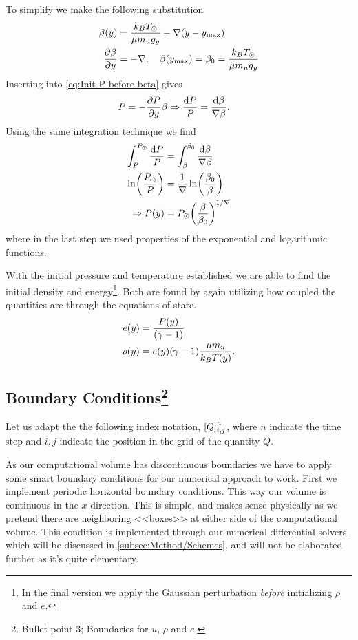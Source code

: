 \documentclass[11pt,a4paper,twocolumn,titlepage]{article}
\newcommand{\disc}[1]    %
{
\ensuremath
\qty[#1]_{i,j}^{n}
}
\begin{document}
To simplify we make the following substitution
\begin{align*}
\beta(y) &= \frac{k_BT_\odot}{\mu m_u g_y}-\nabla(y-y_\text{max})
\\
\pdv{\beta}{y} &= -\nabla \qc \beta(y_\text{max}) = \beta_0 = \frac{k_BT_\odot}{\mu m_u g_y}
\end{align*}
Inserting into \cref{eq:Init P before beta} gives
\begin{align*}
P &= -\pdv{P}{y}\beta \Rightarrow \frac{\dd{P}}{P} = \frac{\dd{\beta}}{\nabla \beta}.
\end{align*}
Using the same integration technique we find
\begin{align}
\int_P^{P_\odot} \frac{\dd{P}}{P} &= \int_\beta^{\beta_0}\frac{\dd{\beta}}{\nabla\beta} \notag
\\
\ln(\frac{P_\odot}{P}) &= \frac{1}{\nabla}\ln(\frac{\beta_0}{\beta}) \notag
\\
\Rightarrow P(y) &= P_\odot \qty(\frac{\beta}{\beta_0})^{1/\nabla} \label{eq:Initial P}
\end{align}
where in the last step we used properties of the exponential and logarithmic functions.

With the initial pressure and temperature established we are able to find the initial density and energy\footnote{In the final version we apply the Gaussian perturbation \textit{before} initializing $\rho$ and $e$.}. Both are found by again utilizing how coupled the quantities are through the equations of state. 
\begin{align}
e(y) &= \frac{P(y)}{(\gamma-1)} \label{eq:Initial e}
\\
\rho(y) &= e(y)\qty(\gamma-1)\frac{\mu m_u}{k_BT(y)}. \label{eq:Initial rho}
\end{align}

\subsection[Boundary Conditions]{Boundary Conditions\protect\footnote{Bullet point 3; Boundaries for $u$, $\rho$ and $e$.}}\label{subsec:Governing/Boundary}
Let us adapt the the following index notation, $\disc{Q}$, where $n$ indicate the time step and $i,j$ indicate the position in the grid of the quantity $Q$.

As our computational volume has discontinuous boundaries we have to apply some smart boundary conditions for our numerical approach to work. First we implement periodic horizontal boundary conditions. This way our volume is continuous in the $x$-direction. This is simple, and makes sense physically as we pretend there are neighboring <<boxes>> at either side of the computational volume. This condition is implemented through our numerical differential solvers, which will be discussed in \ref{subsec:Method/Schemes}, and will not be elaborated further as it's quite elementary.
\end{document}
